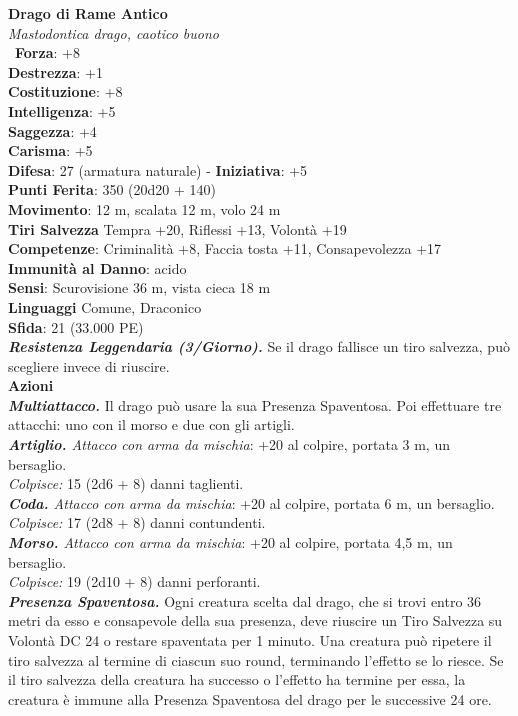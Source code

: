 \begin{multicols}{2}
\medskip\textbf{Drago di Rame Antico}\\
\emph{Mastodontica drago, caotico buono}\\\
\textbf{Forza}: +8\\
\textbf{Destrezza}: +1\\
\textbf{Costituzione}: +8\\
\textbf{Intelligenza}: +5\\
\textbf{Saggezza}: +4\\
\textbf{Carisma}: +5\\
\textbf{Difesa}: 27 (armatura naturale) - \textbf{Iniziativa}: +5\\
\textbf{Punti Ferita}: 350 (20d20 + 140)\\
\textbf{Movimento}: 12 m, scalata 12 m, volo 24 m\\
\textbf{Tiri Salvezza} Tempra +20, Riflessi +13, Volontà +19\\
\textbf{Competenze}: Criminalità +8, Faccia tosta +11, Consapevolezza +17\\
\textbf{Immunità al Danno}: acido\\
\textbf{Sensi}: Scurovisione 36 m, vista cieca 18 m\\
\textbf{Linguaggi} Comune, Draconico\\
\textbf{Sfida}: 21 (33.000 PE)\smallskip\\
\emph{\textbf{Resistenza Leggendaria (3/Giorno).}} Se il drago fallisce un tiro salvezza, può scegliere invece di riuscire.\\
\smallskip\textbf{Azioni}\\
\emph{\textbf{Multiattacco.}} Il drago può usare la sua Presenza Spaventosa. Poi effettuare tre attacchi: uno con il morso e due con gli artigli.\\
\emph{\textbf{Artiglio.} Attacco con arma da mischia}: +20 al colpire, portata 3 m, un bersaglio.\\
\emph{Colpisce:} 15 (2d6 + 8) danni taglienti.\\
\emph{\textbf{Coda.} Attacco con arma da mischia}: +20 al colpire, portata 6 m, un bersaglio.\\
\emph{Colpisce:} 17 (2d8 + 8) danni contundenti.\\
\emph{\textbf{Morso.} Attacco con arma da mischia}: +20 al colpire, portata 4,5 m, un bersaglio.\\
\emph{Colpisce:} 19 (2d10 + 8) danni perforanti.\\
\emph{\textbf{Presenza Spaventosa.}} Ogni creatura scelta dal drago, che si trovi entro 36 metri da esso e consapevole della sua presenza, deve riuscire un Tiro Salvezza su Volontà DC  24 o restare spaventata per 1 minuto. Una creatura può ripetere il tiro salvezza al termine di ciascun suo round, terminando l'effetto se lo riesce. Se il tiro salvezza della creatura ha successo o l'effetto ha termine per essa, la creatura è immune alla Presenza Spaventosa del drago per le successive 24 ore.\\

\end{multicols}
